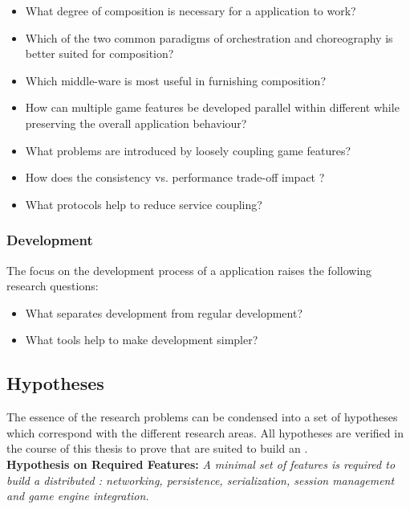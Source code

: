 \begin{itemize}
  \item What degree of composition is necessary for a \ms{} application
  to work?
  \item Which of the two common paradigms of orchestration and choreography is
  better suited for \ms{} composition?
  \item Which middle-ware is most useful in furnishing \ms{} composition?
  \item How can multiple game features be developed parallel within different
  \mss{} while preserving the overall application behaviour?
  \item What problems are introduced by loosely coupling game features?
  \item How does the consistency vs. performance trade-off impact \ogs{}?
  \item What protocols help to reduce service coupling?
\end{itemize}

\subsubsection{\ms{} Development}
The focus on the development process of a \ms{} application raises the
following research questions:

\begin{itemize}
  \item What separates \ms{} development from regular development?
  \item What tools help to make \ms{} development simpler?
\end{itemize}

\subsection{Hypotheses}
\label{sub:hypothesis}

The essence of the research problems can be condensed into a set of hypotheses
which correspond with the different research areas. All hypotheses are
verified in the course of this thesis to prove that \mss{} are suited to
build an \og{}.\\

\noindent\textbf{Hypothesis on Required Features:}
\textit{A minimal set of features is required to build a distributed \og{}:
networking, persistence, serialization, session management and game engine
integration.}\\

